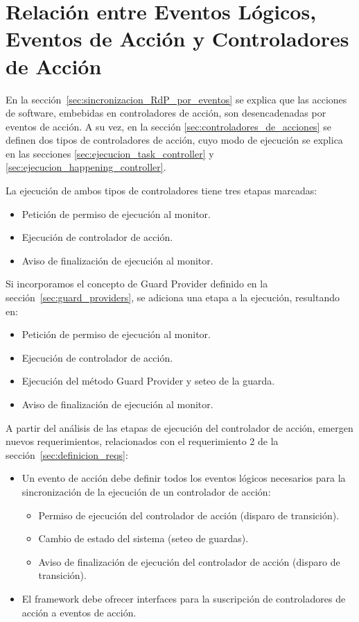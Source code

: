 \section{Relación entre Eventos Lógicos, Eventos de Acción y Controladores de
Acción}
\label{sec:relacion_evento_controlador}
En la sección~\ref{sec:sincronizacion_RdP_por_eventos} se explica que las
acciones de software, embebidas en controladores de acción, son desencadenadas
por eventos de acción. A su vez, en la sección
\ref{sec:controladores_de_acciones} se definen dos tipos de controladores de
acción, cuyo modo de ejecución se explica en las secciones
\ref{sec:ejecucion_task_controller} y \ref{sec:ejecucion_happening_controller}.

La ejecución de ambos tipos de controladores tiene tres etapas marcadas:
\begin{itemize}
  \item Petición de permiso de ejecución al monitor.
  \item Ejecución de controlador de acción.
  \item Aviso de finalización de ejecución al monitor.
\end{itemize}

Si incorporamos el concepto de Guard Provider definido en la
sección~\ref{sec:guard_providers}, se adiciona una etapa a la ejecución,
resultando en:
\begin{itemize}
  \item Petición de permiso de ejecución al monitor.
  \item Ejecución de controlador de acción.
  \item Ejecución del método Guard Provider y seteo de la guarda.
  \item Aviso de finalización de ejecución al monitor.
\end{itemize}

A partir del análisis de las etapas de ejecución del controlador de acción,
emergen nuevos requerimientos, relacionados con el requerimiento 2 de la
sección~\ref{sec:definicion_reqs}:
\begin{itemize}
    \item Un evento de acción debe definir todos los eventos lógicos
    necesarios para la sincronización de la ejecución de un controlador de
    acción:
        \begin{itemize}
          \item Permiso de ejecución del controlador de acción (disparo de
          transición).
          \item Cambio de estado del sistema (seteo de guardas).
          \item Aviso de finalización de ejecución del controlador de acción
          (disparo de transición).
        \end{itemize}
    \item El framework debe ofrecer interfaces para la suscripción de
    controladores de acción a eventos de acción.
\end{itemize}

